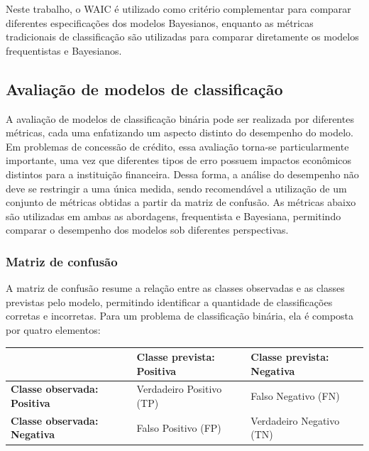 \documentclass[
  brazilian,
  12pt,
  letterpaper,
  DIV=11,
  numbers=noendperiod]{scrartcl}
\newcounter{none} %
\begin{document}
Neste trabalho, o WAIC é utilizado como critério complementar para
comparar diferentes especificações dos modelos Bayesianos, enquanto as
métricas tradicionais de classificação são utilizadas para comparar
diretamente os modelos frequentistas e Bayesianos.

\subsection{Avaliação de modelos de
classificação}\label{avaliauxe7uxe3o-de-modelos-de-classificauxe7uxe3o}

A avaliação de modelos de classificação binária pode ser realizada por
diferentes métricas, cada uma enfatizando um aspecto distinto do
desempenho do modelo. Em problemas de concessão de crédito, essa
avaliação torna-se particularmente importante, uma vez que diferentes
tipos de erro possuem impactos econômicos distintos para a instituição
financeira. Dessa forma, a análise do desempenho não deve se restringir
a uma única medida, sendo recomendável a utilização de um conjunto de
métricas obtidas a partir da matriz de confusão. As métricas abaixo são
utilizadas em ambas as abordagens, frequentista e Bayesiana, permitindo
comparar o desempenho dos modelos sob diferentes perspectivas.

\subsubsection{Matriz de confusão}\label{matriz-de-confusuxe3o}

A matriz de confusão resume a relação entre as classes observadas e as
classes previstas pelo modelo, permitindo identificar a quantidade de
classificações corretas e incorretas. Para um problema de classificação
binária, ela é composta por quatro elementos:

{\def\LTcaptype{none} %
\begin{longtable}[]{@{}
  >{\raggedright\arraybackslash}p{}
  >{\raggedleft\arraybackslash}p{}
  >{\raggedleft\arraybackslash}p{}@{}}
\toprule\noalign{}
\begin{minipage}[b]{\linewidth}\raggedright
\end{minipage} & \begin{minipage}[b]{\linewidth}\raggedleft
Classe prevista: Positiva
\end{minipage} & \begin{minipage}[b]{\linewidth}\raggedleft
Classe prevista: Negativa
\end{minipage} \\
\midrule\noalign{}
\endhead
\bottomrule\noalign{}
\endlastfoot
\textbf{Classe observada: Positiva} & Verdadeiro Positivo (TP) & Falso
Negativo (FN) \\
\textbf{Classe observada: Negativa} & Falso Positivo (FP) & Verdadeiro
Negativo (TN) \\
\end{longtable}
}
\end{document}
